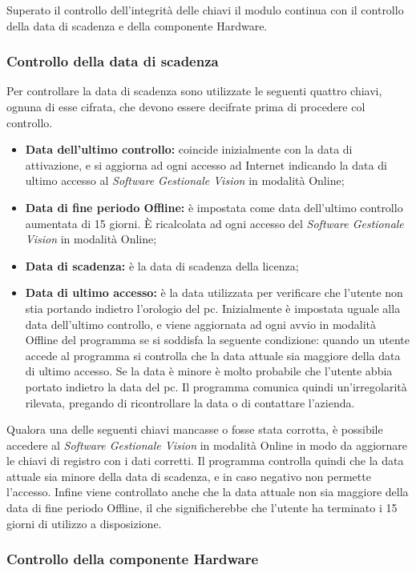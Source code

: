 Superato il controllo dell'integrità delle chiavi il modulo continua con il controllo della data di scadenza e della componente Hardware.

\subsubsection{Controllo della data di scadenza}

Per controllare la data di scadenza sono utilizzate le seguenti quattro chiavi, ognuna di esse cifrata, che devono essere decifrate prima di procedere col controllo. 
\begin{itemize}
\item \textbf{Data dell'ultimo controllo:} coincide inizialmente con la data di attivazione, e si aggiorna ad ogni accesso ad Internet indicando la data di ultimo accesso al \textit{Software Gestionale Vision} in modalità Online;
\item \textbf{Data di fine periodo Offline:} è impostata come data dell'ultimo controllo aumentata di 15 giorni. È ricalcolata ad ogni accesso del \textit{Software Gestionale Vision} in modalità Online;
\item \textbf{Data di scadenza:} è la data di scadenza della licenza;
\item \textbf{Data di ultimo accesso:} è la data utilizzata per verificare che l'utente non stia portando indietro l'orologio del pc. Inizialmente è impostata uguale alla data dell'ultimo controllo, e viene aggiornata ad ogni avvio in modalità Offline del programma se si soddisfa la seguente condizione: quando un utente accede al programma si controlla che la data attuale sia  maggiore della data di ultimo accesso. Se la data è minore è molto probabile che l'utente abbia portato indietro la data del pc. Il programma comunica quindi un'irregolarità rilevata, pregando di ricontrollare la data o di contattare l'azienda.
\end{itemize}
Qualora una delle seguenti chiavi mancasse o fosse stata corrotta, è possibile accedere al \textit{Software Gestionale Vision} in modalità Online in modo da aggiornare le chiavi di registro con i dati corretti.
Il programma controlla quindi che la data attuale sia minore della data di scadenza, e in caso negativo non permette l’accesso. Infine viene controllato anche che la data attuale non sia maggiore della data di fine periodo Offline, il che significherebbe che l’utente ha terminato i 15 giorni di utilizzo a disposizione.

\subsubsection{Controllo della componente Hardware}

